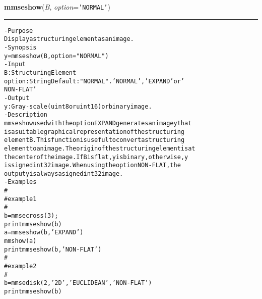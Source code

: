     \label{multireg:num_pymorph:mmseshow}
    \vspace{0.5ex}

    \begin{boxedminipage}{\textwidth}

    \raggedright \textbf{mmseshow}(\textit{B}, \textit{option}=\texttt{'\-N\-O\-R\-M\-A\-L\-'\-})

    \vspace{-1.5ex}

    \rule{\textwidth}{0.5\fboxrule}
\begin{alltt}
- Purpose
    Display a structuring element as an image.
- Synopsis
    y = mmseshow(B, option="NORMAL")
- Input
    B:      Structuring Element
    option: String Default: "NORMAL". 'NORMAL', ' EXPAND' or '
            NON-FLAT'
- Output
    y: Gray-scale (uint8 or uint16) or binary image.
- Description
    mmseshow used with the option EXPAND generates an image y that
    is a suitable graphical representation of the structuring
    element B . This function is useful to convert a structuring
    element to an image. The origin of the structuring element is at
    the center of the image. If B is flat, y is binary, otherwise, y
    is signed int32 image. When using the option NON-FLAT, the
    output y is always a signed int32 image.
- Examples
    \#
    \#   example 1
    \#
    b=mmsecross(3);
    print mmseshow(b)
    a = mmseshow(b,'EXPAND')
    mmshow(a)
    print mmseshow(b,'NON-FLAT')
    \#
    \#   example 2
    \#
    b=mmsedisk(2,'2D','EUCLIDEAN','NON-FLAT')
    print mmseshow(b)\end{alltt}

    \vspace{1ex}

    \end{boxedminipage}

    \label{multireg:num_pymorph:mmsesum}
    \vspace{0.5ex}


